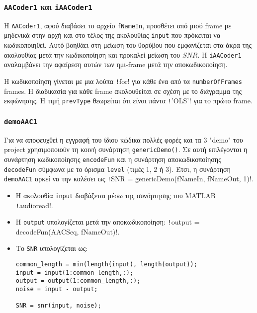 \subsubsection{\texttt{AACoder1} και \texttt{iAACoder1}}\label{sub:AACoder1}
Η \texttt{AACoder1}, αφού διαβάσει το αρχείο \texttt{fNameIn}, προσθέτει από μισό frame με μηδενικά στην αρχή και στο τέλος της ακολουθίας \texttt{input} που πρόκειται να κωδικοποιηθεί.
Αυτό βοηθάει στη μείωση του θορύβου που εμφανίζεται στα άκρα της ακολουθίας μετά την κωδικοποίηση και προκαλεί μείωση του $SNR$.
Η \texttt{iAACoder1} αναλαμβάνει την αφαίρεση αυτών των ημι-frame μετά την αποκωδικοποίηση.

Η κωδικοποίηση γίνεται με μια λούπα \texttt!for! για κάθε ένα από τα \texttt{numberOfFrames} frames.
Η διαδικασία για κάθε frame ακολουθείται σε σχέση με το διάγραμμα της εκφώνησης.
Η τιμή \texttt{prevType} θεωρείται ότι είναι πάντα \texttt!'OLS'! για το πρώτο frame.

\subsubsection{\texttt{demoAAC1}}
Για να αποφευχθεί η εγγραφή του ίδιου κώδικα πολλές φορές και τα 3 "demo" του project χρησιμοποιούν τη κοινή συνάρτηση \texttt{genericDemo()}\label{genericDemo}.
Σε αυτή επιλέγονται η συνάρτηση κωδικοποίησης \texttt{encodeFun} και η συνάρτηση αποκωδικοποίησης \texttt{decodeFun} σύμφωνα με το όρισμα \texttt{level} (τιμές 1, 2 ή 3).
Έτσι, η συνάρτηση \texttt{demoAAC1} αρκεί να την καλέσει ως \texttt!SNR = genericDemo(fNameIn, fNameOut, 1)!.

\begin{itemize}
\item Η ακολουθία \texttt{input} διαβάζεται μέσω της συνάρτησης του MATLAB \texttt!audioread!.

\item Η \texttt{output} υπολογίζεται μετά την αποκωδικοποίηση:
\texttt!output = decodeFun(AACSeq, fNameOut)!.

\item Το \texttt{SNR} υπολογίζεται ως:
\begin{verbatim}
common_length = min(length(input), length(output));
input = input(1:common_length,:);
output = output(1:common_length,:);
noise = input - output;

SNR = snr(input, noise);
\end{verbatim}
\end{itemize}

